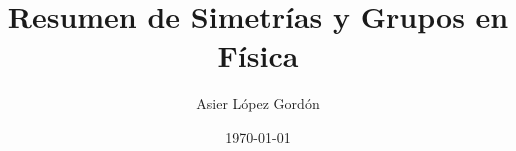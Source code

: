 \documentclass{article}
\title{Resumen de Simetrías y Grupos en Física}
\author{Asier López Gordón}
\date{\today}
\begin{document}
\maketitle
\fakesection{}





\end{document}
